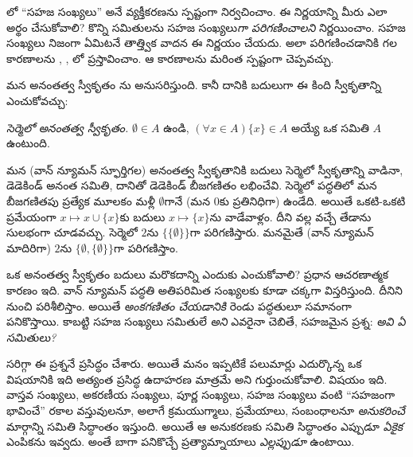 \documentclass[../../../include/open-logic-section]{subfiles}
\begin{document}
	


లో
``సహజ సంఖ్యలు'' అనే
వ్యక్తీకరణను స్పష్టంగా
నిర్వచించాం. ఈ నిర్ణయాన్ని
మీరు ఎలా అర్థం చేసుకోవాలి?
కొన్ని సమితులను సహజ సంఖ్యలు\emph{గా పరిగణించాలని}
నిర్ణయించాం. సహజ సంఖ్యలు నిజంగా ఏమిటనే తాత్త్విక వాదన
ఈ నిర్ణయం చేయదు. అలా
పరిగణించడానికి గల కారణాలను
,
,
లో
ప్రస్తావించాం. ఆ
కారణాలను మరింత స్పష్టంగా
చెప్పవచ్చు.

మన అనంతత్వ స్వీకృతం
\citet{VonNeumann1925}ను
అనుసరిస్తుంది. కానీ
దానికి బదులుగా ఈ
కింది స్వీకృతాన్ని
ఎంచుకోవచ్చు:

\begin{defish}
\emph{సెర్మెలో \citeyear{Zermelo1908Untersuchungen}
అనంతత్వ స్వీకృతం.}
$\emptyset \in A$ ఉండి,
$(\forall x \in A)\{x\} \in A$
అయ్యే ఒక సమితి $A$
ఉంటుంది.
\end{defish}

మన (వాన్ న్యూమన్ స్ఫూర్తిగల)
అనంతత్వ స్వీకృతానికి
బదులు సెర్మెలో స్వీకృతాన్ని
వాడినా, డెడెకిండ్ అనంత
సమితి, దానితో డెడెకిండ్
బీజగణితం లభించేవి.
సెర్మెలో పద్ధతిలో మన
బీజగణితపు ప్రత్యేక మూలకం
మళ్లీ $\emptyset$గానే
(మన $0$కు ప్రతినిధిగా)
ఉండేది. అయితే ఒకటి-ఒకటి ప్రమేయంగా
$x \mapsto x \cup \{x\}$కు బదులు
$x \mapsto \{x\}$ను వాడేవాళ్లం.
దీని వల్ల వచ్చే తేడాను సులభంగా చూడవచ్చు.
సెర్మెలో $2$ను
$\{\{\emptyset\}\}$గా పరిగణిస్తారు.
మనమైతే (వాన్ న్యూమన్ మాదిరిగా)
$2$ను $\{\emptyset, \{\emptyset\}\}$గా
పరిగణిస్తాం.

ఒక అనంతత్వ స్వీకృతం
బదులు మరొకదాన్ని ఎందుకు
ఎంచుకోవాలి? ప్రధాన
ఆచరణాత్మక కారణం ఇది.
వాన్ న్యూమన్ పద్ధతి
అతిపరిమిత సంఖ్యలకు కూడా చక్కగా విస్తరిస్తుంది.
దీనిని 
నుంచి పరిశీలిస్తాం.
అయితే \emph{అంకగణితం చేయడానికి}
రెండు పద్ధతులూ సమానంగా పనికొస్తాయి.
కాబట్టి సహజ సంఖ్యలు
సమితులే \emph{అని}
ఎవరైనా చెబితే,
సహజమైన ప్రశ్న:
\emph{అవి ఏ సమితులు?}

సరిగ్గా ఈ ప్రశ్ననే
\citet{Benacerraf1965}
ప్రసిద్ధం చేశారు. అయితే
మనం ఇప్పటికే పలుమార్లు
ఎదుర్కొన్న ఒక విషయానికి
ఇది అత్యంత ప్రసిద్ధ ఉదాహరణ
మాత్రమే అని గుర్తుంచుకోవాలి.
విషయం ఇది.
వాస్తవ సంఖ్యలు, అకరణీయ
సంఖ్యలు, పూర్ణ సంఖ్యలు,
సహజ సంఖ్యలు వంటి
``సహజంగా భావించే''
రకాల వస్తువులనూ, అలాగే
క్రమయుగ్మాలు, ప్రమేయాలు,
సంబంధాలనూ \emph{అనుకరించే}
మార్గాన్ని సమితి సిద్ధాంతం
ఇస్తుంది. అయితే ఆ
అనుకరణకు సమితి సిద్ధాంతం
ఎప్పుడూ \emph{ఏకైక}
ఎంపికను ఇవ్వదు. అంతే బాగా
పనికొచ్చే ప్రత్యామ్నాయాలు
\emph{ఎల్లప్పుడూ} ఉంటాయి.
\end{document}

